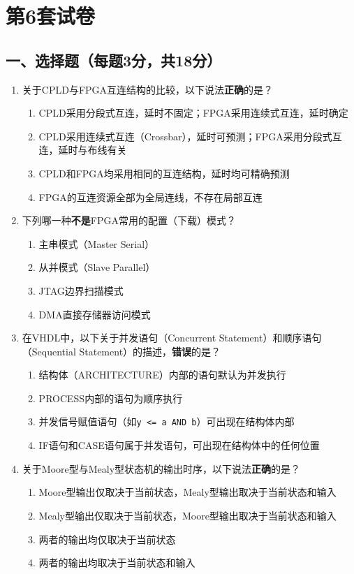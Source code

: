\chapter{第6套试卷}

\section*{一、选择题（每题3分，共18分）}

\begin{enumerate}[label=\arabic*.]

\item 关于CPLD与FPGA互连结构的比较，以下说法\textbf{正确}的是？
\begin{enumerate}[label=\Alph*.]
  \item CPLD采用分段式互连，延时不固定；FPGA采用连续式互连，延时确定
  \item CPLD采用连续式互连（Crossbar），延时可预测；FPGA采用分段式互连，延时与布线有关
  \item CPLD和FPGA均采用相同的互连结构，延时均可精确预测
  \item FPGA的互连资源全部为全局连线，不存在局部互连
\end{enumerate}

\item 下列哪一种\textbf{不是}FPGA常用的配置（下载）模式？
\begin{enumerate}[label=\Alph*.]
  \item 主串模式（Master Serial）
  \item 从并模式（Slave Parallel）
  \item JTAG边界扫描模式
  \item DMA直接存储器访问模式
\end{enumerate}

\item 在VHDL中，以下关于并发语句（Concurrent Statement）和顺序语句（Sequential Statement）的描述，\textbf{错误}的是？
\begin{enumerate}[label=\Alph*.]
  \item 结构体（ARCHITECTURE）内部的语句默认为并发执行
  \item PROCESS内部的语句为顺序执行
  \item 并发信号赋值语句（如\verb|y <= a AND b|）可出现在结构体内部
  \item IF语句和CASE语句属于并发语句，可出现在结构体中的任何位置
\end{enumerate}

\item 关于Moore型与Mealy型状态机的输出时序，以下说法\textbf{正确}的是？
\begin{enumerate}[label=\Alph*.]
  \item Moore型输出仅取决于当前状态，Mealy型输出取决于当前状态和输入
  \item Mealy型输出仅取决于当前状态，Moore型输出取决于当前状态和输入
  \item 两者的输出均仅取决于当前状态
  \item 两者的输出均取决于当前状态和输入
\end{enumerate}


\end{enumerate}

